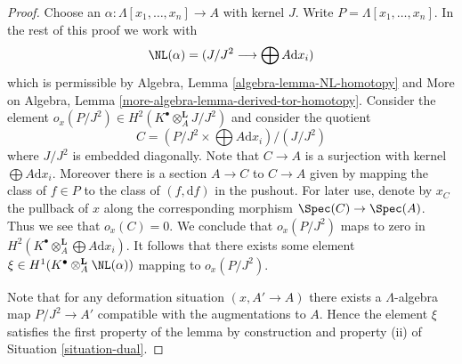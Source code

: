 \begin{proof}
Choose an $\alpha : \Lambda[x_1, \ldots, x_n] \to A$ with kernel $J$.
Write $P = \Lambda[x_1, \ldots, x_n]$. In the rest of this proof we work with
$$
\NL(\alpha) = (J/J^2 \longrightarrow \bigoplus A \text{d}x_i)
$$
which is permissible by
Algebra, Lemma \ref{algebra-lemma-NL-homotopy}
and
More on Algebra, Lemma \ref{more-algebra-lemma-derived-tor-homotopy}.
Consider the element
$o_x(P/J^2) \in H^2(K^\bullet \otimes_A^\mathbf{L} J/J^2)$ and consider
the quotient
$$
C = (P/J^2 \times \bigoplus A \text{d}x_i)/(J/J^2)
$$
where $J/J^2$ is embedded diagonally. Note that $C \to A$ is a surjection
with kernel $\bigoplus A\text{d}x_i$. Moreover there is a section
$A \to C$ to $C \to A$ given by mapping the class of $f \in P$ to the class
of $(f, \text{d}f)$ in the pushout. For later use, denote by $x_C$ the
pullback of $x$ along the corresponding morphism $\Spec(C) \to \Spec(A)$.
Thus we see that $o_x(C) = 0$.
We conclude that $o_x(P/J^2)$ maps to zero in
$H^2(K^\bullet \otimes_A^\mathbf{L} \bigoplus A\text{d}x_i)$.
It follows that there exists some element
$\xi \in H^1(K^\bullet \otimes_A^\mathbf{L} \NL(\alpha))$
mapping to $o_x(P/J^2)$.

\medskip\noindent
Note that for any deformation situation $(x, A' \to A)$ there exists
a $\Lambda$-algebra map $P/J^2 \to A'$ compatible with the augmentations
to $A$. Hence the
element $\xi$ satisfies the first property of the lemma by construction
and property (ii) of Situation \ref{situation-dual}.


\end{proof}
